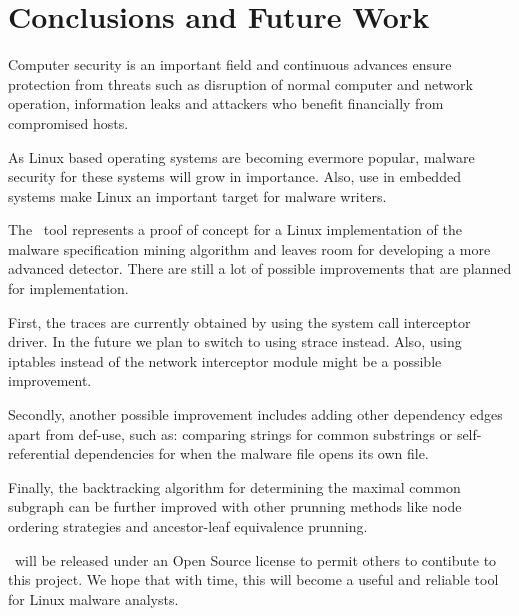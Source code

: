 \chapter{Conclusions and Future Work}
\label{chapter:sixth-chapter}

Computer security is an important field and continuous advances ensure protection from threats such as disruption of normal computer and network operation, information leaks and attackers who benefit financially from compromised hosts.

As Linux based operating systems are becoming evermore popular, malware security for these systems will grow in importance. Also, use in embedded systems make Linux an important target for malware writers.

The \textbf{\project}\ tool represents a proof of concept for a Linux implementation of the malware specification mining algorithm and leaves room for developing a more advanced detector. There are still a lot of possible improvements that are planned for implementation.

First, the traces are currently obtained by using the system call interceptor driver. In the future we plan to switch to using strace instead. Also, using iptables instead of the network interceptor module might be a possible improvement.

Secondly, another possible improvement includes adding other dependency edges apart from def-use, such as: comparing strings for common substrings or self-referential dependencies for when the malware file opens its own file.

Finally, the backtracking algorithm for determining the maximal common subgraph can be further improved with other prunning methods like node ordering strategies and ancestor-leaf equivalence prunning.

\textbf{\project}\ will be released under an Open Source license to permit others to contibute to this project. We hope that with time, this will become a useful and reliable tool for Linux malware analysts.